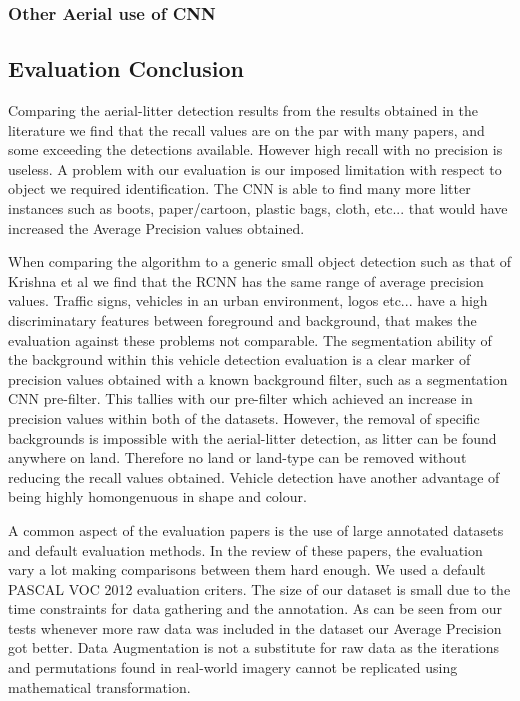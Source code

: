\documentclass{IEEEtran}
\begin{document}
\subsubsection{Other Aerial use of CNN}


\subsection{Evaluation Conclusion}

Comparing the aerial-litter detection results from the results obtained in the literature we find that the recall values are on the par with many papers, and some exceeding the detections available. However high recall with no precision is useless. A problem with our evaluation is our imposed limitation with respect to object we required identification. The CNN is able to find many more litter instances such as boots, paper/cartoon, plastic bags, cloth, etc... that would have increased the Average Precision values obtained. \newline

When comparing the algorithm to a generic small object detection such as that of Krishna et al \cite{Krishna} we find that the RCNN has the same range of average precision values. Traffic signs, vehicles in an urban environment, logos etc... have a high discriminatary features between foreground and background, that makes the evaluation against these problems not comparable. The segmentation ability of the background within this vehicle detection evaluation is a clear marker of precision values obtained with a known background filter, such as a segmentation CNN pre-filter. This tallies with our pre-filter which achieved an increase in precision values within both of the datasets. However, the removal of specific backgrounds is impossible with the aerial-litter detection, as litter can be found anywhere on land. Therefore no land or land-type can be removed without reducing the recall values obtained. Vehicle detection have another advantage of being highly homongenuous in shape and colour.\newline

A common aspect of the evaluation papers is the use of large annotated datasets and default evaluation methods. In the review of these papers, the evaluation vary a lot making comparisons between them hard enough. We used a default PASCAL VOC 2012 evaluation criters. The size of our dataset is small due to the time constraints for data gathering and the annotation. As can be seen from our tests whenever more raw data was included in the dataset our Average Precision got better. Data Augmentation is not a substitute for raw data as the iterations and permutations found in real-world imagery cannot be replicated using mathematical transformation. \newline







\end{document}
